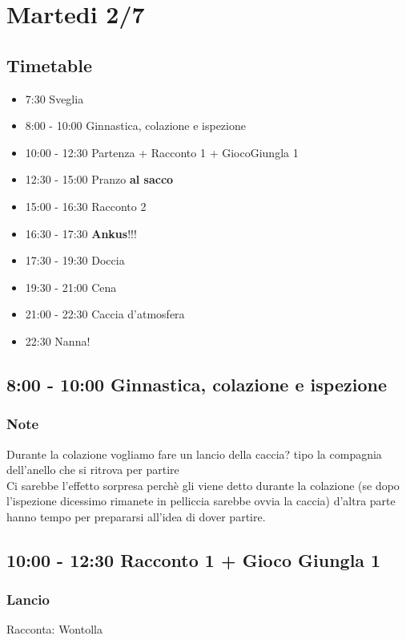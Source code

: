 \documentclass[../main.tex]{subfiles}
\begin{document}
   \section{Martedi 2/7}
   \subsection{Timetable}
   \begin{itemize}
        \item 7:30 Sveglia
        \item 8:00 - 10:00 Ginnastica, colazione e ispezione
        \item 10:00 - 12:30 Partenza + Racconto 1 + GiocoGiungla 1
        \item 12:30 - 15:00 Pranzo \textbf{al sacco}
        \item 15:00 - 16:30 Racconto 2
        \item 16:30 - 17:30 \textbf{Ankus}!!!
        \item 17:30 - 19:30 Doccia
        \item 19:30 - 21:00 Cena
        \item 21:00 - 22:30 Caccia d'atmosfera
        \item 22:30 Nanna!
    \end{itemize}

    \subsection{8:00 - 10:00 Ginnastica, colazione e ispezione}
        \subsubsection{Note}
        Durante la colazione vogliamo fare un lancio della caccia? tipo la compagnia dell'anello che si ritrova per partire \\ 
        Ci sarebbe l'effetto sorpresa perchè gli viene detto durante la colazione (se dopo l'ispezione dicessimo rimanete in pelliccia sarebbe ovvia la caccia) d'altra parte hanno tempo per prepararsi all'idea di dover partire.
    \subsection{10:00 - 12:30 Racconto 1 + Gioco Giungla 1}
       \subsubsection{Lancio}
        Racconta: Wontolla
\end{document}
